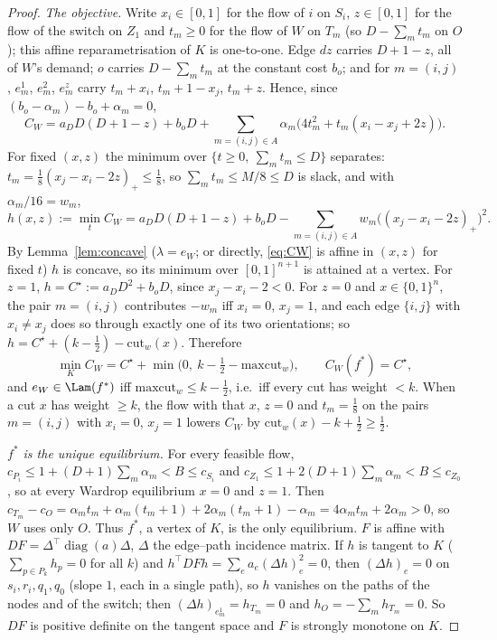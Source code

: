 \begin{proof}
\emph{The objective.} Write $x_i\in[0,1]$ for the flow of $i$ on $S_i$, $z\in[0,1]$ for the flow of the switch on $Z_1$ and $t_m\ge0$ for the flow of $W$ on $T_m$ (so $D-\sum_mt_m$ on $O$); this affine reparametrisation of $K$ is one-to-one. Edge $dz$ carries $D+1-z$, all of $W$'s demand; $o$ carries $D-\sum_mt_m$ at the constant cost $b_o$; and for $m=(i,j)$, $e^1_m$, $e^2_m$, $e^z_m$ carry $t_m+x_i$, $t_m+1-x_j$, $t_m+z$. Hence, since $(b_o-\alpha_m)-b_o+\alpha_m=0$,
\begin{equation}\label{eq:CW}
C_W=a_DD(D+1-z)+b_oD+\sum_{m=(i,j)\in A}\alpha_m\big(4t_m^2+t_m(x_i-x_j+2z)\big).
\end{equation}
For fixed $(x,z)$ the minimum over $\{t\ge0,\ \sum_mt_m\le D\}$ separates: $t_m=\tfrac18(x_j-x_i-2z)_+\le\tfrac18$, so $\sum_mt_m\le M/8\le D$ is slack, and with $\alpha_m/16=w_m$,
\[
h(x,z):=\min_tC_W=a_DD(D+1-z)+b_oD-\sum_{m=(i,j)\in A}w_m\big((x_j-x_i-2z)_+\big)^2 .
\]
By Lemma~\ref{lem:concave} ($\lambda=e_W$; or directly, \eqref{eq:CW} is affine in $(x,z)$ for fixed $t$) $h$ is concave, so its minimum over $[0,1]^{n+1}$ is attained at a vertex. For $z=1$, $h=C^\star:=a_DD^2+b_oD$, since $x_j-x_i-2<0$. For $z=0$ and $x\in\{0,1\}^n$, the pair $m=(i,j)$ contributes $-w_m$ iff $x_i=0$, $x_j=1$, and each edge $\{i,j\}$ with $x_i\ne x_j$ does so through exactly one of its two orientations; so $h=C^\star+(k-\tfrac12)-\mathrm{cut}_w(x)$. Therefore
\[
\min_KC_W=C^\star+\min\big(0,\ k-\tfrac12-\mathrm{maxcut}_w\big),\qquad C_W(f^*)=C^\star,
\]
and $e_W\in\Lam(f^*)$ iff $\mathrm{maxcut}_w\le k-\tfrac12$, i.e.\ iff every cut has weight $<k$. When a cut $x$ has weight $\ge k$, the flow with that $x$, $z=0$ and $t_m=\tfrac18$ on the pairs $m=(i,j)$ with $x_i=0$, $x_j=1$ lowers $C_W$ by $\mathrm{cut}_w(x)-k+\tfrac12\ge\tfrac12$.

\emph{$f^*$ is the unique equilibrium.} For every feasible flow, $c_{P_i}\le1+(D+1)\sum_m\alpha_m<B\le c_{S_i}$ and $c_{Z_1}\le1+2(D+1)\sum_m\alpha_m<B\le c_{Z_0}$, so at every Wardrop equilibrium $x=0$ and $z=1$. Then $c_{T_m}-c_O=\alpha_mt_m+\alpha_m(t_m+1)+2\alpha_m(t_m+1)-\alpha_m=4\alpha_mt_m+2\alpha_m>0$, so $W$ uses only $O$. Thus $f^*$, a vertex of $K$, is the only equilibrium. $F$ is affine with $DF=\Delta^{\!\top}\operatorname{diag}(a)\Delta$, $\Delta$ the edge--path incidence matrix. If $h$ is tangent to $K$ ($\sum_{p\in P_k}h_p=0$ for all $k$) and $h^{\!\top}DFh=\sum_ea_e(\Delta h)_e^2=0$, then $(\Delta h)_e=0$ on $s_i,r_i,q_1,q_0$ (slope $1$, each in a single path), so $h$ vanishes on the paths of the nodes and of the switch; then $(\Delta h)_{e^1_m}=h_{T_m}=0$ and $h_O=-\sum_mh_{T_m}=0$. So $DF$ is positive definite on the tangent space and $F$ is strongly monotone on $K$.


\end{proof}
